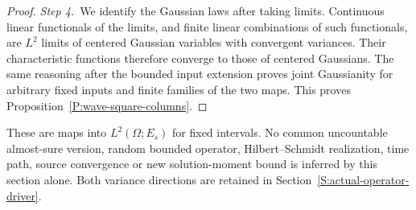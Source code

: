 \begin{proof}
  \medskip
  \noindent\textit{Step 4.~}We identify the Gaussian laws after taking limits.
  Continuous linear functionals of the limits, and finite linear combinations of
  such functionals, are $L^2$ limits of centered Gaussian variables with
  convergent variances. Their characteristic functions therefore converge to
  those of centered Gaussians. The same reasoning after the bounded input
  extension proves joint Gaussianity for arbitrary fixed inputs and finite
  families of the two maps. This proves Proposition~\ref{P:wave-square-columns}.
\end{proof}

These are maps into $L^2(\Omega;E_s)$ for fixed intervals. No common uncountable
almost-sure version, random bounded operator, Hilbert--Schmidt realization, time
path, source convergence or new solution-moment bound is inferred by this
section alone. Both variance directions are retained in
Section~\ref{S:actual-operator-driver}.
